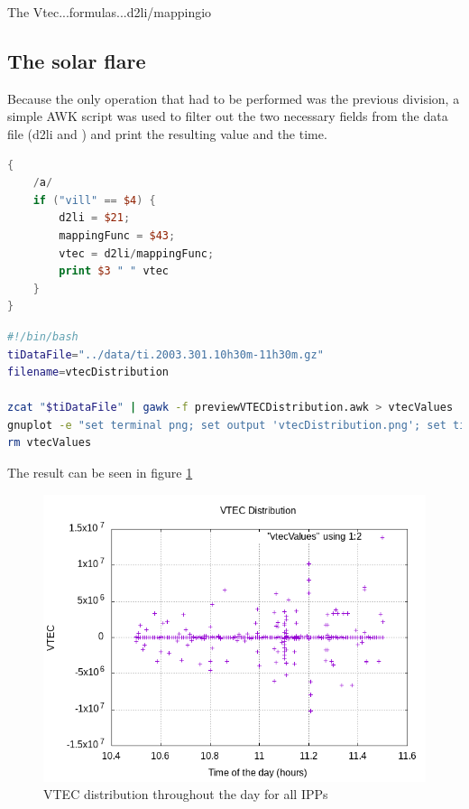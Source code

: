 The Vtec...formulas...d2li/mappingio


\subsection{The solar flare}

Because the only operation that had to be performed was the previous division, a simple AWK script was used to filter out the two necessary fields from the data file (d2li and ) and print the resulting value and the time. 

\begin{lstlisting}[language=Awk, caption=process]
{
	/a/
	if ("vill" == $4) {
		d2li = $21;
		mappingFunc = $43;
		vtec = d2li/mappingFunc;
		print $3 " " vtec
	}
}
\end{lstlisting}

\begin{lstlisting}[language=Bash, caption=process]
#!/bin/bash
tiDataFile="../data/ti.2003.301.10h30m-11h30m.gz"
filename=vtecDistribution

zcat "$tiDataFile" | gawk -f previewVTECDistribution.awk > vtecValues
gnuplot -e "set terminal png; set output 'vtecDistribution.png'; set title 'VTEC Distribution'; set xlabel 'Time of the day (hours)'; set ylabel 'VTEC'; set grid; plot \"vtecValues\" using 1:2 with point"
rm vtecValues
\end{lstlisting}

The result can be seen in figure \ref{fig:vtecDistributionGeneral}

\begin{figure}[ht]
	\centering	
	\includegraphics[width=0.6\linewidth]{images/ch4/vtecDistributionGeneral.png}
	\caption{VTEC distribution throughout the day for all IPPs}
	\label{fig:vtecDistributionGeneral}
\end{figure}

